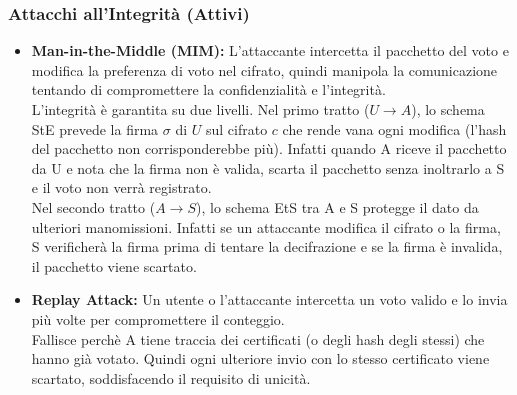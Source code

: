 \subsubsection{Attacchi all'Integrità (Attivi)}
\begin{itemize}
	\item \textbf{Man-in-the-Middle (MIM):} L'attaccante intercetta il pacchetto del voto e modifica la preferenza di voto nel cifrato, quindi manipola la comunicazione tentando di compromettere la confidenzialità e l'integrità.\\
	L'integrità è garantita su due livelli. Nel primo tratto ($U \to A$), lo schema StE prevede la firma $\sigma$ di $U$ sul cifrato $c$ che rende vana ogni modifica (l'hash del pacchetto non corrisponderebbe più). Infatti quando A riceve il pacchetto da U e nota che la firma non è valida, scarta il pacchetto senza inoltrarlo a S e il voto non verrà registrato.\\
	Nel secondo tratto ($A \to S$), lo schema EtS tra A e S protegge il dato da ulteriori manomissioni. Infatti se un attaccante modifica il cifrato o la firma, S verificherà la firma prima di tentare la decifrazione e se la firma è invalida, il pacchetto viene scartato.
	
	\item \textbf{Replay Attack:} Un utente o l'attaccante intercetta un voto valido e lo invia più volte per compromettere il conteggio.\\
	Fallisce perchè A tiene traccia dei certificati (o degli hash degli stessi) che hanno già votato. Quindi ogni ulteriore invio con lo stesso certificato viene scartato, soddisfacendo il requisito di unicità.
\end{itemize}


